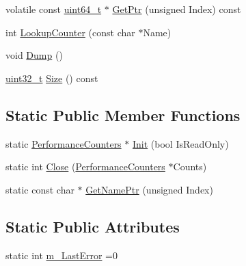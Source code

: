 \begin{DoxyCompactItemize}
\item 
volatile const \hyperlink{stdint_8h_aaa5d1cd013383c889537491c3cfd9aad}{uint64\+\_\+t} $\ast$ \hyperlink{structleveldb_1_1_performance_counters_aa9af1436bd4f31acdf9633441c71cff1}{Get\+Ptr} (unsigned Index) const 
\item 
int \hyperlink{structleveldb_1_1_performance_counters_af9c0e39cf2512f4ebe1069af8837e073}{Lookup\+Counter} (const char $\ast$Name)
\item 
void \hyperlink{structleveldb_1_1_performance_counters_ab80e6cb677761fbc4061d0d9b9d83e80}{Dump} ()
\item 
\hyperlink{stdint_8h_a435d1572bf3f880d55459d9805097f62}{uint32\+\_\+t} \hyperlink{structleveldb_1_1_performance_counters_af1987ece135c698fde481393ce966d98}{Size} () const 
\end{DoxyCompactItemize}
\subsection*{Static Public Member Functions}
\begin{DoxyCompactItemize}
\item 
static \hyperlink{structleveldb_1_1_performance_counters}{Performance\+Counters} $\ast$ \hyperlink{structleveldb_1_1_performance_counters_a9189ae5525f22a8c93515edd9f63195e}{Init} (bool Is\+Read\+Only)
\item 
static int \hyperlink{structleveldb_1_1_performance_counters_af8d05606f8163c30ea06c7ebc0b95599}{Close} (\hyperlink{structleveldb_1_1_performance_counters}{Performance\+Counters} $\ast$Counts)
\item 
static const char $\ast$ \hyperlink{structleveldb_1_1_performance_counters_a60a71f3b2ad54e8c6bc3a783fcc11a86}{Get\+Name\+Ptr} (unsigned Index)
\end{DoxyCompactItemize}
\subsection*{Static Public Attributes}
\begin{DoxyCompactItemize}
\item 
static int \hyperlink{structleveldb_1_1_performance_counters_a75bf05d8a2c27abd2a86af2f9444859f}{m\+\_\+\+Last\+Error} =0
\end{DoxyCompactItemize}
